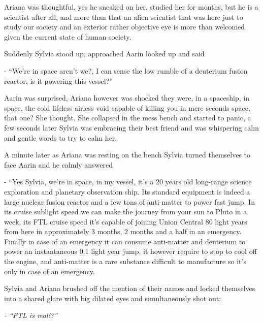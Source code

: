 \documentclass[hidelinks,12pt,a4paper]{book}
\begin{document}
Ariana was thoughtful, yes he sneaked on her, studied her for months, but he is a scientist after all, 
and more than that an alien scientist that was here just to study our society and an exterior rather objective 
eye is more than welcomed given the current state of human society.\par
\bigskip

Suddenly Sylvia stood up, approached Aarin looked up and said \par
\bigskip
- “We're in space aren't we?, I can sense the low rumble of a deuterium fusion reactor, is it powering this vessel?” \par
\bigskip

Aarin was surprised, Ariana however was shocked they were, in a spaceship, in space, the cold lifeless airless void 
capable of killing you in mere seconds space, that one? She thought. She collapsed in the mess bench and started to panic, 
a few seconds later Sylvia was embracing their best friend and was whispering calm and gentle words to try to calm her.\par
\bigskip

A minute later as Ariana was resting on the bench Sylvia turned themselves to face Aarin and he calmly answered\par
\bigskip

- “Yes Sylvia, we're in space, in my vessel, it's a 20 years old long-range science exploration 
and planetary observation ship. Its standard equipment is indeed a large nuclear fusion reactor and a 
few tons of anti-matter to power fast jump. In its cruise sublight speed we can make the journey from your sun 
to Pluto in a week, its FTL cruise speed it's capable of joining Union Central 80 light years from here 
in approximately 3 months, 2 months and a half in an emergency. Finally in case of an emergency it can consume 
anti-matter and deuterium to power an instantaneous 0.1 light year jump, it however require to stop to cool 
off the engine, and anti-matter is a rare substance difficult to manufacture so it's only in case of an emergency.\par
\bigskip

Sylvia and Ariana brushed off the mention of their names and locked themselves into a shared glare with big 
dilated eyes and simultaneously shot out:\par
\bigskip

\textit{- “FTL is real!?”}\par
\bigskip
\end{document}
